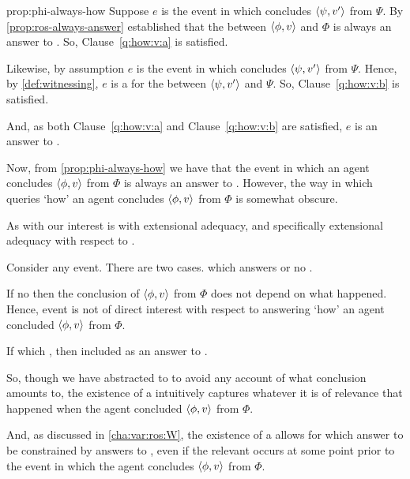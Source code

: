 \begin{note}
  \begin{argument}{prop:phi-always-how}
    Suppose \(e\) is the event in which \vAgent{} concludes \(\langle \psi, v' \rangle\) from \(\Psi\).
    By \autoref{prop:ros-always-answer} established that the \ros{} between \(\langle \phi, v \rangle\) and \(\Phi\) is always an answer to \qWhyV{}.
    So, Clause~\ref{q:how:v:a} is satisfied.

    Likewise, by assumption \(e\) is the event in which \vAgent{} concludes \(\langle \psi, v' \rangle\) from \(\Psi\).
    Hence, by \autoref{def:witnessing}, \(e\) is a \wit{} for the \ros{} between \(\langle \psi, v' \rangle\) and \(\Psi\).
    So, Clause~\ref{q:how:v:b} is satisfied.

    And, as both Clause~\ref{q:how:v:a} and Clause~\ref{q:how:v:b} are satisfied, \(e\) is an answer to \qHowV{}.
  \end{argument}

\end{note}

\begin{note}
  Now, from \autoref{prop:phi-always-how} we have that the event in which an agent concludes \(\langle \phi, v \rangle\) from \(\Phi\) is always an answer to \qHowV{}.
  However, the way in which \qHowV{} queries `how' an agent concludes \(\langle \phi, v \rangle\) from \(\Phi\) is somewhat obscure.

  As with \qWhyV{} our interest is with extensional adequacy, and specifically extensional adequacy with respect to .

  Consider any event.
  There are two cases.
  \ros{} which answers \qWhyV{} or no \ros{}.

  If no \ros{} then the \agents{} conclusion of \(\langle \phi, v \rangle\) from \(\Phi\) does not depend on what happened.
  Hence, event is not of direct interest with respect to answering `how' an agent concluded \(\langle \phi, v \rangle\) from \(\Phi\).

  If \ros{} which \qWhyV{}, then included as an answer to \qHowV{}.

  So, though we have abstracted to  to avoid any account of what conclusion amounts to, the existence of a  intuitively captures whatever it is of relevance that happened when the agent concluded \(\langle \phi, v \rangle\) from \(\Phi\).

  And, as discussed in \autoref{cha:var:ros:W}, the existence of a  allows for \ros{} which answer \qWhyV{} to be constrained by answers to \qHowV{}, even if the relevant  occurs at some point prior to the event in which the agent concludes \(\langle \phi, v \rangle\) from \(\Phi\).
\end{note}

